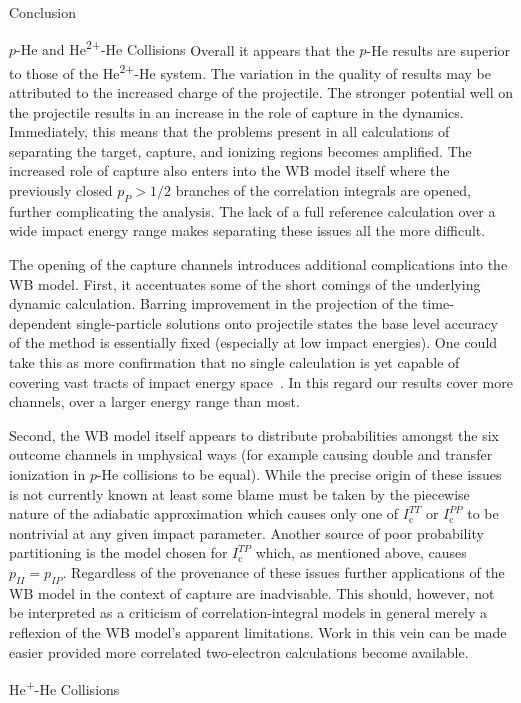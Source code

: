 \documentclass[letterpaper, 11 pt]{report}
\begin{document}
\begin{chapter}{Conclusion \label{chap:con}}
\begin{section}{\texorpdfstring{$p$}{p}-He and \texorpdfstring{He\textsuperscript{2+}}{He2+}-He
                   Collisions \label{sec:con-phe2p-he}}
      Overall it appears that the $p$-He results are superior to those of the He\textsuperscript{2+}-He
      system. The variation in the quality of results may be attributed to the increased charge of the
      projectile. The stronger potential well on the projectile results in an increase in the role of
      capture in the dynamics. Immediately, this means that the problems present in all calculations of
      separating the target, capture, and ionizing regions becomes amplified. The increased role of
      capture also enters into the WB model itself where the previously closed $p_P > 1/2$ branches of
      the correlation integrals are opened, further complicating the analysis. The lack of a full
      reference calculation over a wide impact energy range makes separating these issues all the more
      difficult.

      The opening of the capture channels introduces additional complications into the WB model. First,
      it accentuates some of the short comings of the underlying dynamic calculation. Barring
      improvement in the projection of the time-dependent single-particle solutions onto projectile
      states the base level accuracy of the method is essentially fixed (especially at low impact
      energies). One could take this as more confirmation that no single calculation is yet capable of
      covering vast tracts of impact energy space~\cite{LRV-14}. In this regard our results cover more
      channels, over a larger energy range than most.
      
      Second, the WB model itself appears to distribute probabilities amongst the six outcome channels in
      unphysical ways (for example causing double and transfer ionization in $p$-He collisions to be
      equal). While the precise origin of these issues is not currently known at least some blame must
      be taken by the piecewise nature of the adiabatic approximation which causes only one of
      $I^{TT}_\mathrm{c}$ or $I^{PP}_\mathrm{c}$ to be nontrivial at any given impact parameter. Another
      source of poor probability partitioning is the model chosen for $I^{TP}_\mathrm{c}$ which, as
      mentioned above, causes $p_{II} = p_{IP}$. Regardless of the provenance of these issues further
      applications of the WB model in the context of capture are inadvisable. This should, however, not
      be interpreted as a criticism of correlation-integral models in general merely a reflexion of the
      WB model's apparent limitations. Work in this vein can be made easier provided more correlated
      two-electron calculations become available.

   \end{section}

   \begin{section}{\texorpdfstring{He\textsuperscript{+}}{He+}-He Collisions \label{sec:con-hephe}}

   \end{section}

\end{chapter}

\cleardoublepage
{}
{}

\end{document}
